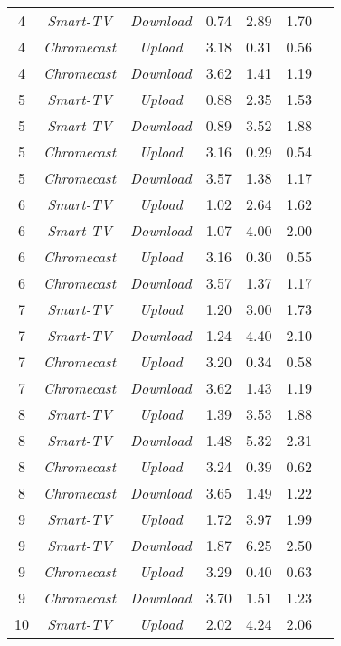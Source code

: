 \begin{longtable}{|c|c|c|c|c|c|c|}
    4 & \textit{Smart-TV} & \textit{Download} & 0.74 & 2.89 & 1.70 \\
    4 & \textit{Chromecast} & \textit{Upload} & 3.18 & 0.31 & 0.56 \\
    4 & \textit{Chromecast} & \textit{Download} & 3.62 & 1.41 & 1.19 \\
    \hline
    5 & \textit{Smart-TV} & \textit{Upload} & 0.88 & 2.35 & 1.53 \\
    5 & \textit{Smart-TV} & \textit{Download} & 0.89 & 3.52 & 1.88 \\
    5 & \textit{Chromecast} & \textit{Upload} & 3.16 & 0.29 & 0.54 \\
    5 & \textit{Chromecast} & \textit{Download} & 3.57 & 1.38 & 1.17 \\
    \hline
    6 & \textit{Smart-TV} & \textit{Upload} & 1.02 & 2.64 & 1.62 \\
    6 & \textit{Smart-TV} & \textit{Download} & 1.07 & 4.00 & 2.00 \\
    6 & \textit{Chromecast} & \textit{Upload} & 3.16 & 0.30 & 0.55 \\
    6 & \textit{Chromecast} & \textit{Download} & 3.57 & 1.37 & 1.17 \\
    \hline
    7 & \textit{Smart-TV} & \textit{Upload} & 1.20 & 3.00 & 1.73 \\
    7 & \textit{Smart-TV} & \textit{Download} & 1.24 & 4.40 & 2.10 \\
    7 & \textit{Chromecast} & \textit{Upload} & 3.20 & 0.34 & 0.58 \\
    7 & \textit{Chromecast} & \textit{Download} & 3.62 & 1.43 & 1.19 \\
    \hline
    8 & \textit{Smart-TV} & \textit{Upload} & 1.39 & 3.53 & 1.88 \\
    8 & \textit{Smart-TV} & \textit{Download} & 1.48 & 5.32 & 2.31 \\
    8 & \textit{Chromecast} & \textit{Upload} & 3.24 & 0.39 & 0.62 \\
    8 & \textit{Chromecast} & \textit{Download} & 3.65 & 1.49 & 1.22 \\
    \hline
    9 & \textit{Smart-TV} & \textit{Upload} & 1.72 & 3.97 & 1.99 \\
    9 & \textit{Smart-TV} & \textit{Download} & 1.87 & 6.25 & 2.50 \\
    9 & \textit{Chromecast} & \textit{Upload} & 3.29 & 0.40 & 0.63 \\
    9 & \textit{Chromecast} & \textit{Download} & 3.70 & 1.51 & 1.23 \\
    \hline
    10 & \textit{Smart-TV} & \textit{Upload} & 2.02 & 4.24 & 2.06 \\

\end{longtable}
